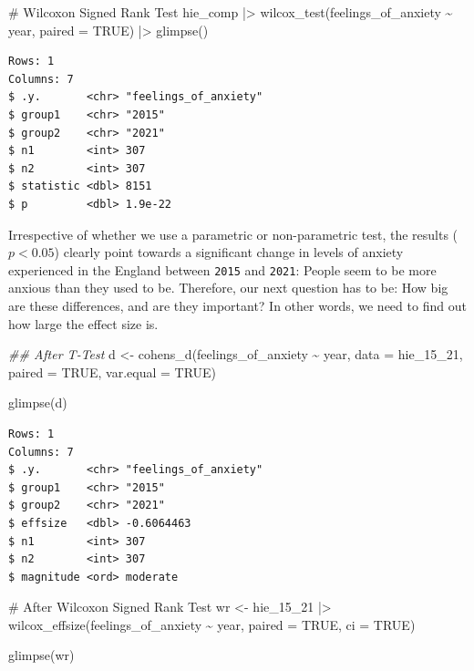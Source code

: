 \documentclass[
  letterpaper,
]{krantz}
\makeatletter
\newenvironment{Shaded}{\begin{snugshade}}{\end{snugshade}}
\newcommand{\AttributeTok}[1]{\textcolor[rgb]{0.40,0.45,0.13}{#1}}
\newcommand{\CommentTok}[1]{\textcolor[rgb]{0.37,0.37,0.37}{#1}}
\newcommand{\ConstantTok}[1]{\textcolor[rgb]{0.56,0.35,0.01}{#1}}
\newcommand{\DocumentationTok}[1]{\textcolor[rgb]{0.37,0.37,0.37}{\textit{#1}}}
\newcommand{\FunctionTok}[1]{\textcolor[rgb]{0.28,0.35,0.67}{#1}}
\newcommand{\NormalTok}[1]{\textcolor[rgb]{0.00,0.23,0.31}{#1}}
\newcommand{\OtherTok}[1]{\textcolor[rgb]{0.00,0.23,0.31}{#1}}
\newcommand{\SpecialCharTok}[1]{\textcolor[rgb]{0.37,0.37,0.37}{#1}}
\newenvironment{kframe}{%
\medskip{}
\setlength{\fboxsep}{.8em}
 \def\at@end@of@kframe{}%
 \ifinner\ifhmode%
  \def\at@end@of@kframe{\end{minipage}}%
  \begin{minipage}{\columnwidth}%
 \fi\fi%
 \def\FrameCommand##1{\hskip\@totalleftmargin \hskip-\fboxsep
 \colorbox{shadecolor}{##1}\hskip-\fboxsep
     \hskip-\linewidth \hskip-\@totalleftmargin \hskip\columnwidth}%
 \MakeFramed {\advance\hsize-\width
   \@totalleftmargin\z@ \linewidth\hsize
   \@setminipage}}%
 {\par\unskip\endMakeFramed%
 \at@end@of@kframe}
\renewenvironment{Shaded}{\begin{kframe}}{\end{kframe}}
\makeatother
\begin{document}
\begin{Shaded}
\begin{Highlighting}[]
\CommentTok{\# Wilcoxon Signed Rank Test}
\NormalTok{hie\_comp }\SpecialCharTok{|\textgreater{}}
  \FunctionTok{wilcox\_test}\NormalTok{(feelings\_of\_anxiety }\SpecialCharTok{\textasciitilde{}}\NormalTok{ year,}
              \AttributeTok{paired =} \ConstantTok{TRUE}\NormalTok{) }\SpecialCharTok{|\textgreater{}}
  \FunctionTok{glimpse}\NormalTok{()}
\end{Highlighting}
\end{Shaded}

\begin{verbatim}
Rows: 1
Columns: 7
$ .y.       <chr> "feelings_of_anxiety"
$ group1    <chr> "2015"
$ group2    <chr> "2021"
$ n1        <int> 307
$ n2        <int> 307
$ statistic <dbl> 8151
$ p         <dbl> 1.9e-22
\end{verbatim}

Irrespective of whether we use a parametric or non-parametric test, the
results (\(p < 0.05\)) clearly point towards a significant change in
levels of anxiety experienced in the England between \texttt{2015} and
\texttt{2021}: People seem to be more anxious than they used to be.
Therefore, our next question has to be: How big are these differences,
and are they important? In other words, we need to find out how large
the effect size is.

\begin{Shaded}
\begin{Highlighting}[]
\DocumentationTok{\#\# After T{-}Test}
\NormalTok{d }\OtherTok{\textless{}{-}} \FunctionTok{cohens\_d}\NormalTok{(feelings\_of\_anxiety }\SpecialCharTok{\textasciitilde{}}\NormalTok{ year,}
               \AttributeTok{data =}\NormalTok{ hie\_15\_21,}
               \AttributeTok{paired =} \ConstantTok{TRUE}\NormalTok{,}
               \AttributeTok{var.equal =} \ConstantTok{TRUE}\NormalTok{)}

\FunctionTok{glimpse}\NormalTok{(d)}
\end{Highlighting}
\end{Shaded}

\begin{verbatim}
Rows: 1
Columns: 7
$ .y.       <chr> "feelings_of_anxiety"
$ group1    <chr> "2015"
$ group2    <chr> "2021"
$ effsize   <dbl> -0.6064463
$ n1        <int> 307
$ n2        <int> 307
$ magnitude <ord> moderate
\end{verbatim}

\begin{Shaded}
\begin{Highlighting}[]
\CommentTok{\# After Wilcoxon Signed Rank Test}
\NormalTok{wr }\OtherTok{\textless{}{-}}
\NormalTok{  hie\_15\_21 }\SpecialCharTok{|\textgreater{}}
  \FunctionTok{wilcox\_effsize}\NormalTok{(feelings\_of\_anxiety }\SpecialCharTok{\textasciitilde{}}\NormalTok{ year,}
                   \AttributeTok{paired =} \ConstantTok{TRUE}\NormalTok{, }\AttributeTok{ci =} \ConstantTok{TRUE}\NormalTok{)}

\FunctionTok{glimpse}\NormalTok{(wr)}
\end{Highlighting}
\end{Shaded}
\end{document}

